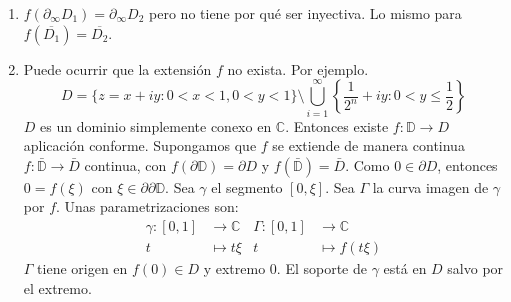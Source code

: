 \begin{remark}
    \hfill
    \begin{enumerate}
        \item $f(\partial_\infty D_1) = \partial_\infty D_2$ pero no tiene por qué ser inyectiva.
              Lo mismo para $f(\overline{D_1}) = \overline{D_2}$.
        \item Puede ocurrir que la extensión $f$ no exista.
              Por ejemplo.
              $$D = \{z = x + iy : 0 < x < 1, 0 < y < 1\} \setminus \bigcup_{i=1}^\infty \left\{\frac{1}{2^n} + iy : 0 < y \leq \frac{1}{2}\right\}$$
              $D$ es un dominio simplemente conexo en $\mathbb{C}$.
              Entonces existe $f: \mathbb{D} \to D$ aplicación conforme.
              Supongamos que $f$ se extiende de manera continua $f: \bar{\mathbb{D}} \to \bar{D}$ continua, con $f(\partial\mathbb{D}) = \partial D$ y $f(\bar{\mathbb{D}}) = \bar{D}$.
              Como $0 \in \partial D$, entonces $0 = f(\xi)$ con $\xi \in \partial \partial\mathbb{D}$.
              Sea $\gamma$ el segmento $[0, \xi]$.
              Sea $\Gamma$ la curva imagen de $\gamma$ por $f$.
              Unas parametrizaciones son:
              \begin{align*}
                  \gamma: [0, 1] & \to \mathbb{C} & \Gamma: [0, 1] & \to \mathbb{C}  \\
                  t              & \mapsto t\xi   & t              & \mapsto f(t\xi)
              \end{align*}
              $\Gamma$ tiene origen en $f(0) \in D$ y extremo 0.
              El soporte de $\gamma$ está en $D$ salvo por el extremo.
    \end{enumerate}
\end{remark}